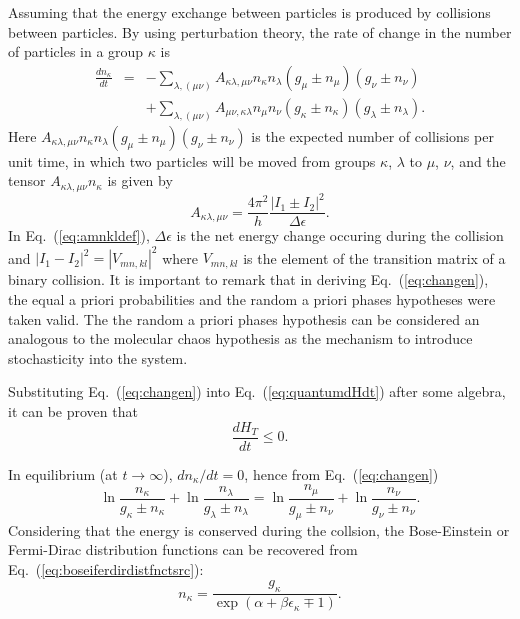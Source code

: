 Assuming that the energy exchange between particles is produced by collisions between particles.
By using perturbation theory, the rate of change in the number of particles in a group $\kappa$ is
%
\begin{eqnarray}\label{eq:changen}
    \frac{d n_{\kappa}}{dt}&=&-\sum_{\lambda,(\mu \nu)}A_{\kappa\lambda,\mu\nu} n_{\kappa}n_{\lambda}(g_{\mu}\pm n_{\mu})(g_{\nu}\pm n_{\nu})\nonumber \\
    &&+\sum_{\lambda,(\mu \nu)}A_{\mu\nu,\kappa\lambda} n_{\mu}n_{\nu}(g_{\kappa}\pm n_{\kappa})(g_{\lambda}\pm n_{\lambda}).
\end{eqnarray}
%
Here $A_{\kappa\lambda,\mu\nu}n_{\kappa}n_{\lambda}(g_{\mu}\pm n_{\mu})(g_{\nu}\pm n_{\nu})$ is the
expected number of collisions per unit time, in which two particles will be moved from groups
$\kappa$, $\lambda$ to $\mu$, $\nu$, and the tensor $A_{\kappa\lambda,\mu\nu}n_{\kappa}$ is given by
%
\begin{equation}\label{eq:amnkldef}
  A_{\kappa\lambda,\mu\nu}=\frac{4\pi^{2}}{h}\frac{|I_1\pm I_2|^2}{\Delta \epsilon}.
\end{equation}
%
In Eq.~(\ref{eq:amnkldef}), $\Delta\epsilon$ is the net energy change occuring during the
collision and $|I_1-I_2|^2=|V_{mn,kl}|^2$ where
$V_{mn,kl}$ is the element of the transition matrix of a binary collision.
It is important to remark that in deriving Eq.~(\ref{eq:changen}), the equal a priori
probabilities and the random a priori phases hypotheses were taken valid. The 
the random a priori phases hypothesis can be
considered an analogous to the molecular chaos hypothesis
\cite{bib:das2018} as the mechanism to introduce stochasticity into the system.

Substituting Eq.~(\ref{eq:changen}) into Eq.~(\ref{eq:quantumdHdt}) after some algebra, it can be proven that
%
\begin{equation}
    \frac{dH_T}{dt}\leq 0. \label{eq:H-theorem-tolman}
\end{equation}
%

In equilibrium (at $t\to\infty$), $dn_{\kappa}/dt=0$, hence from Eq.~(\ref{eq:changen})
%
\begin{equation}\label{eq:boseiferdirdistfnctsrc}
    \ln \frac{n_{\kappa}}{g_{\kappa}\pm n_{\kappa}}+\ln \frac{n_{\lambda}}{g_{\lambda}\pm n_{\lambda}}=\ln \frac{n_{\mu}}{g_{\mu}\pm n_{\nu}}+\ln \frac{n_{\nu}}{g_{\nu}\pm n_{\nu}}.
\end{equation}
%
Considering that the energy is conserved during the collsion, the Bose-Einstein or Fermi-Dirac distribution
functions can be recovered from Eq.~(\ref{eq:boseiferdirdistfnctsrc}):
%
\begin{equation}
   n_{\kappa}=\frac{g_{\kappa}}{\exp(\alpha+\beta\epsilon_{\kappa}\mp1)}.
\end{equation}
%

